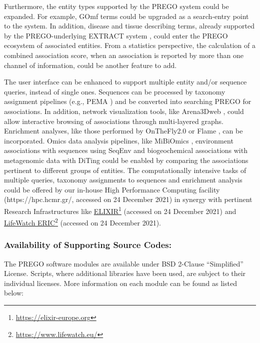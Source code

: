 {   Furthermore, the entity types supported by the PREGO system could be expanded. For example, GOmf terms could be upgraded as a search-entry point to the system. 
   In addition, disease and tissue describing terms, already supported by the PREGO-underlying EXTRACT system \citep{pafilis2016extract}, could enter the PREGO ecosystem of associated entities. 
   From a statistics perspective, the calculation of a combined association score, when an association is reported by more than one channel of information, could be another feature to add.

   The user interface can be enhanced to support multiple entity and/or sequence queries, instead of single ones. 
   Sequences can be processed by taxonomy assignment pipelines (e.g., PEMA \citep{zafeiropoulos2020pema}) and be converted into searching PREGO for associations. 
   In addition, network visualization tools, like Arena3Dweb \citep{karatzas2021arena3dweb}, could allow interactive browsing of associations through multi-layered graphs. 
   Enrichment analyses, like those performed by OnTheFly2.0 \citep{baltoumas2021onthefly2} or Flame \citep{thanati2021flame}, 
   can be incorporated. 
   Omics data analysis pipelines, like MiBiOmics \citep{zoppi2021mibiomics}, environment associations with sequences using SeqEnv \citep{sinclair2016seqenv} and biogeochemical associations with metagenomic data with DiTing \citep{xue2021diting} could be enabled by comparing the associations pertinent to different groups of entities. 
   The computationally intensive tasks of multiple queries, taxonomy assignments to sequences and enrichment analysis could be offered by our in-house High Performance Computing facility (https://hpc.hcmr.gr/, accessed on 24 December 2021) \citep{zafeiropoulos20210s} in synergy with pertinent Research Infrastructures like \href{https://elixir-europe.org}{ELIXIR}\footnote{\href{https://elixir-europe.org}{https://elixir-europe.org}} (accessed on 24 December 2021) and \href{https://www.lifewatch.eu/}{LifeWatch ERIC}\footnote{\href{https://www.lifewatch.eu/}{https://www.lifewatch.eu/}} (accessed on 24 December 2021).



   \subsubsection*{Availability of Supporting Source Codes:} 
   The PREGO software modules are available under BSD 2-Clause “Simplified” License. Scripts, where additional libraries have been used, are subject to their individual licenses. More information on each module can be found as listed below:
   
}
